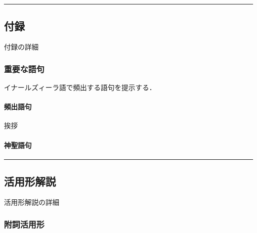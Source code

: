\documentclass[
  japanese,
]{article}
\providecommand{\tightlist}{%
  \setlength{\itemsep}{0pt}\setlength{\parskip}{0pt}}
\begin{document}
\begin{center}\rule{0.5\linewidth}{0.5pt}\end{center}

\subsection{付録}\label{chapter9}

付録の詳細

\subsubsection{重要な語句}\label{section9.1}

イナールズィーラ語で頻出する語句を提示する．

\paragraph{頻出語句}\label{subsection9.1.1}

\begin{description}
\item[挨拶]
\end{description}

\paragraph{神聖語句}\label{subsection9.1.2}

\begin{description}
\tightlist
\item[]
\end{description}

\begin{center}\rule{0.5\linewidth}{0.5pt}\end{center}

\subsection{活用形解説}\label{chapter10}

活用形解説の詳細

\subsubsection{附詞活用形}\label{section10.1}
\end{document}
